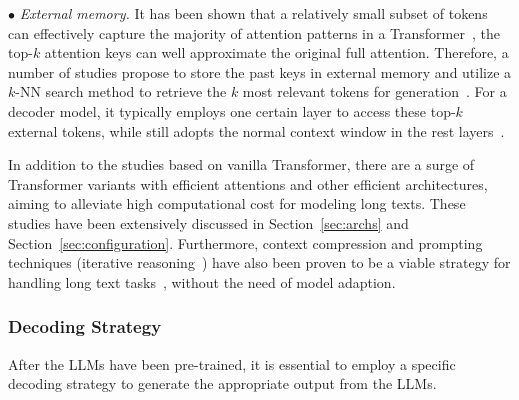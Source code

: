 {{
$\bullet$ \emph{External memory.}
It has been shown that a relatively small subset of tokens can effectively capture the majority of attention patterns in a Transformer~\cite{Bertsch-arxiv-2023-Unlimiformer}, \ie the top-$k$ attention keys can well approximate the original full attention. Therefore, a number of studies propose to store the past keys in external memory and utilize a $k$-NN search method to retrieve the $k$ most relevant  tokens for generation~\cite{Wu-ICLR-2022-Memorizing, Bertsch-arxiv-2023-Unlimiformer, Tworkowski-arxiv-2023-Focused}. For a decoder model, 
it typically employs one certain layer to access these top-$k$ external tokens, while still adopts the normal context window in the rest layers~\cite{Wu-ICLR-2022-Memorizing,Tworkowski-arxiv-2023-Focused}.}

}











{In addition to the studies based on vanilla Transformer, there are a surge of Transformer variants with efficient attentions and other efficient architectures, aiming to alleviate high computational cost for modeling long texts. These studies have been extensively discussed in Section~\ref{sec:archs} and Section~\ref{sec:configuration}. 
{Furthermore,  context compression and prompting techniques (\eg iterative reasoning~\cite{Chen-arxiv-2023-Walking}) have also been proven to be a viable strategy for  handling long text tasks}~\cite{zhou-arxiv-2023-recurrentgpt,Packer-arxiv-2023-MemGPT,Chen-arxiv-2023-Walking,Xu-arxiv-2023-retrieval}, without the need of model adaption.}

\subsubsection{Decoding Strategy}
\label{sec-decoding}
After the LLMs have been pre-trained, it is essential to employ a specific decoding strategy to generate the appropriate output from the LLMs. 

